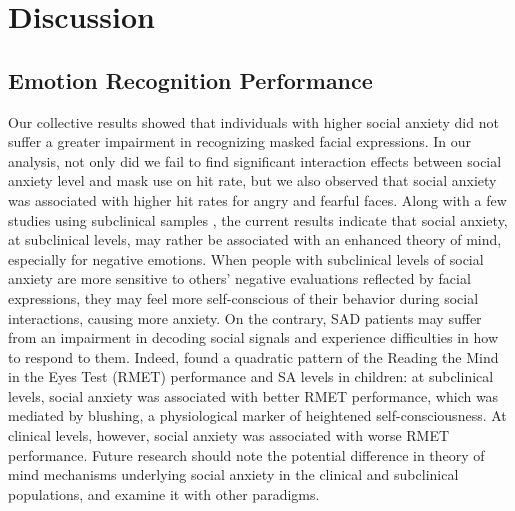 \section{Discussion}
\subsection{Emotion Recognition Performance}
Our collective results showed that individuals with higher social anxiety did not suffer a greater impairment in recognizing masked facial expressions. In our analysis, not only did we fail to find significant interaction effects between social anxiety level and mask use on hit rate, but we also observed that social anxiety was associated with higher hit rates for angry and fearful faces.
Along with a few studies using subclinical samples \citep{SUTTERBY2012242, tibi2011social}, the current results indicate that social anxiety, at subclinical levels, may rather be associated with an enhanced theory of mind, especially for negative emotions. When people with subclinical levels of social anxiety are more sensitive to others’ negative evaluations reflected by facial expressions, they may feel more self-conscious of their behavior during social interactions, causing more anxiety. On the contrary, SAD patients may suffer from an impairment in decoding social signals and experience difficulties in how to respond to them. Indeed, \citet{Nikolić} found a quadratic pattern of the Reading the Mind in the Eyes Test (RMET) performance and SA levels in children: at subclinical levels, social anxiety was associated with better RMET performance, which was mediated by blushing, a physiological marker of heightened self-consciousness. At clinical levels, however, social anxiety was associated with worse RMET performance. Future research should note the potential difference in theory of mind mechanisms underlying social anxiety in the clinical and subclinical populations, and examine it with other paradigms.
